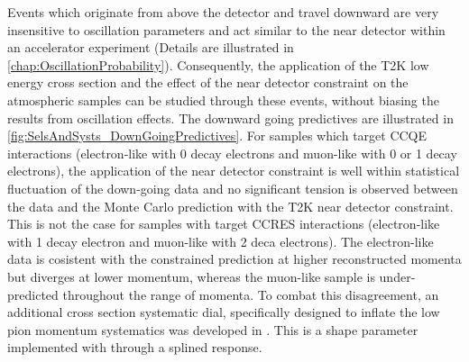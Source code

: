 Events which originate from above the detector and travel downward are very insensitive to oscillation parameters and act similar to the near detector within an accelerator experiment (Details are illustrated in \autoref{chap:OscillationProbability}). Consequently, the application of the T2K low energy cross section and the effect of the near detector constraint on the atmospheric samples can be studied through these events, without biasing the results from oscillation effects. The downward going predictives are illustrated in \autoref{fig:SelsAndSysts_DownGoingPredictives}. For samples which target CCQE interactions (electron-like with 0 decay electrons and muon-like with 0 or 1 decay electrons), the application of the near detector constraint is well within statistical fluctuation of the down-going data and no significant tension is observed between the data and the Monte Carlo prediction with the T2K near detector constraint. This is not the case for samples with target CCRES interactions (electron-like with 1 decay electron and muon-like with 2 deca electrons). The electron-like data is cosistent with the constrained prediction at higher reconstructed momenta but diverges at lower momentum, whereas the muon-like sample is under-predicted throughout the range of momenta. To combat this disagreement, an additional cross section systematic dial, specifically designed to inflate the low pion momentum systematics was developed in \cite{t2k_tn_422}. This is a shape parameter implemented with through a splined response.

